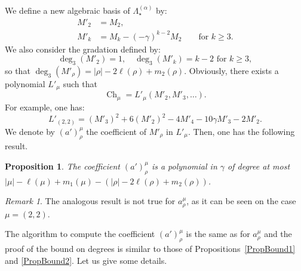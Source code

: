 \documentclass[11pt]{amsart}
\theoremstyle{plain}
\newtheorem{proposition}[lemma]{Proposition}
\theoremstyle{remark}
\newtheorem*{remark}{Remark}
\newcommand{\Pola}{\Lambda_\star^{(\alpha)}}
\DeclareMathOperator{\Ch}{Ch}
\begin{document}
We define a new algebraic basis of $\Pola$ by:
\begin{align*} 
M'_2 & =M_2,\\ 
M'_k & = M_k - (-\gamma)^{k-2} M_2 \qquad \text{for } k\geq 3.
\end{align*}
We also consider the gradation defined by:
\[\deg_3(M'_2) = 1, \quad \deg_3(M'_k) =k-2 \text{ for }k\ge 3,\]
so that $\deg_3(M'_\rho)=|\rho|-2\ell(\rho) +m_2(\rho)$.
Obviously, there exists a polynomial $L'_\mu$ such that
\[ \Ch_\mu = L'_\mu(M'_2,M'_3,\dots).\]
For example, one has:
\[L'_{(2,2)} = (M'_3)^2 +6(M'_2)^2 - 4 M'_4 -10 \gamma M'_3 -2M'_2.\]
We denote by $(a')_\rho^\mu$ the coefficient of $M'_\rho$ in $L'_\mu$.
Then, one has the following result.

\begin{proposition}\label{PropBound3}
    The coefficient $(a')_\rho^\mu$ is a polynomial in $\gamma$
    of degree at most $|\mu|-\ell(\mu)+m_1(\mu) - (|\rho|-2\ell(\rho) +m_2(\rho))$.
\end{proposition}
\begin{remark}
    The analogous result is not true for $a_\rho^\mu$,
    as it can be seen on the case $\mu=(2,2)$.
\end{remark}
The algorithm to compute the coefficient $(a')_\rho^\mu$ is the same as for $a_\rho^\mu$
and the proof of the bound on degrees is similar to those of 
Propositions~\ref{PropBound1} and \ref{PropBound2}.
Let us give some details.
\end{document}
